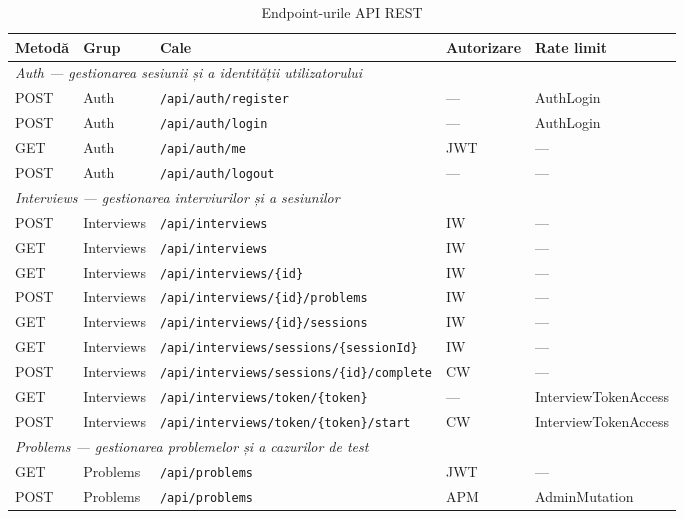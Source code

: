 \begin{table}[ht]
\centering
\caption{Endpoint-urile API REST}
\label{tab:api_endpoints}
\small
\begin{tabular}{llp{3.8cm}p{2.8cm}p{2.4cm}}
\hline
\textbf{Metodă} & \textbf{Grup} & \textbf{Cale} & \textbf{Autorizare} & \textbf{Rate limit} \\
\hline
\multicolumn{5}{l}{\textit{Auth — gestionarea sesiunii și a identității utilizatorului}} \\
\hline
POST & Auth & \texttt{/api/auth/register}       & —   & AuthLogin \\
POST & Auth & \texttt{/api/auth/login}           & —   & AuthLogin \\
GET  & Auth & \texttt{/api/auth/me}              & JWT & — \\
POST & Auth & \texttt{/api/auth/logout}          & —   & — \\
\hline
\multicolumn{5}{l}{\textit{Interviews — gestionarea interviurilor și a sesiunilor}} \\
\hline
POST & Interviews & \texttt{/api/interviews}                         & IW  & — \\
GET  & Interviews & \texttt{/api/interviews}                         & IW  & — \\
GET  & Interviews & \texttt{/api/interviews/\{id\}}                  & IW  & — \\
POST & Interviews & \texttt{/api/interviews/\{id\}/problems}         & IW  & — \\
GET  & Interviews & \texttt{/api/interviews/\{id\}/sessions}         & IW  & — \\
GET  & Interviews & \texttt{/api/interviews/sessions/\{sessionId\}}  & IW  & — \\
POST & Interviews & \texttt{/api/interviews/sessions/\{id\}/complete}& CW  & — \\
GET  & Interviews & \texttt{/api/interviews/token/\{token\}}         & —   & InterviewTokenAccess \\
POST & Interviews & \texttt{/api/interviews/token/\{token\}/start}   & CW  & InterviewTokenAccess \\
\hline
\multicolumn{5}{l}{\textit{Problems — gestionarea problemelor și a cazurilor de test}} \\
\hline
GET  & Problems & \texttt{/api/problems}                            & JWT & — \\
POST & Problems & \texttt{/api/problems}                            & APM & AdminMutation \\

\end{tabular}
\end{table}
